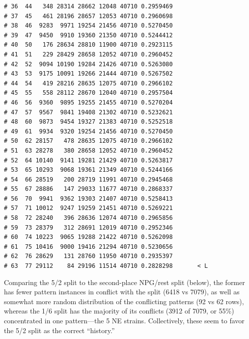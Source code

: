 \documentclass{article}\usepackage[]{graphicx}\usepackage[]{color}
\makeatletter
\newenvironment{kframe}{%
 \def\at@end@of@kframe{}%
 \ifinner\ifhmode%
  \def\at@end@of@kframe{\end{minipage}}%
  \begin{minipage}{\columnwidth}%
 \fi\fi%
 \def\FrameCommand##1{\hskip\@totalleftmargin \hskip-\fboxsep
 \colorbox{shadecolor}{##1}\hskip-\fboxsep
     \hskip-\linewidth \hskip-\@totalleftmargin \hskip\columnwidth}%
 \MakeFramed {\advance\hsize-\width
   \@totalleftmargin\z@ \linewidth\hsize
   \@setminipage}}%
 {\par\unskip\endMakeFramed%
 \at@end@of@kframe}
\newenvironment{knitrout}{}{} %
\makeatother
\begin{document}
\begin{knitrout}
\begin{kframe}
\begin{verbatim}
# 36  44   348 28314 28662 12048 40710 0.2959469          
# 37  45   461 28196 28657 12053 40710 0.2960698          
# 38  46  9283  9971 19254 21456 40710 0.5270450          
# 39  47  9450  9910 19360 21350 40710 0.5244412          
# 40  50   176 28634 28810 11900 40710 0.2923115          
# 41  51   229 28429 28658 12052 40710 0.2960452          
# 42  52  9094 10190 19284 21426 40710 0.5263080          
# 43  53  9175 10091 19266 21444 40710 0.5267502          
# 44  54   419 28216 28635 12075 40710 0.2966102          
# 45  55   558 28112 28670 12040 40710 0.2957504          
# 46  56  9360  9895 19255 21455 40710 0.5270204          
# 47  57  9567  9841 19408 21302 40710 0.5232621          
# 48  60  9873  9454 19327 21383 40710 0.5252518          
# 49  61  9934  9320 19254 21456 40710 0.5270450          
# 50  62 28157   478 28635 12075 40710 0.2966102          
# 51  63 28278   380 28658 12052 40710 0.2960452          
# 52  64 10140  9141 19281 21429 40710 0.5263817          
# 53  65 10293  9068 19361 21349 40710 0.5244166          
# 54  66 28519   200 28719 11991 40710 0.2945468          
# 55  67 28886   147 29033 11677 40710 0.2868337          
# 56  70  9941  9362 19303 21407 40710 0.5258413          
# 57  71 10012  9247 19259 21451 40710 0.5269221          
# 58  72 28240   396 28636 12074 40710 0.2965856          
# 59  73 28379   312 28691 12019 40710 0.2952346          
# 60  74 10223  9065 19288 21422 40710 0.5262098          
# 61  75 10416  9000 19416 21294 40710 0.5230656          
# 62  76 28629   131 28760 11950 40710 0.2935397          
# 63  77 29112    84 29196 11514 40710 0.2828298       < L
\end{verbatim}
\end{kframe}
\end{knitrout}

Comparing the 5/2 split to the second-place NPG/rest split (below), the former has fewer pattern instances in conflict
with the split (6418 vs 7079), as well as somewhat more random distribution of the conflicting patterns (92 vs 62 rows),
whereas the 1/6 split has the majority of its conflicts (3912 of 7079, or 55\%) concentrated in one pattern---the 5 NE
strains.  Collectively, these seem to favor the 5/2 split as the correct ``history.''
\end{document}
